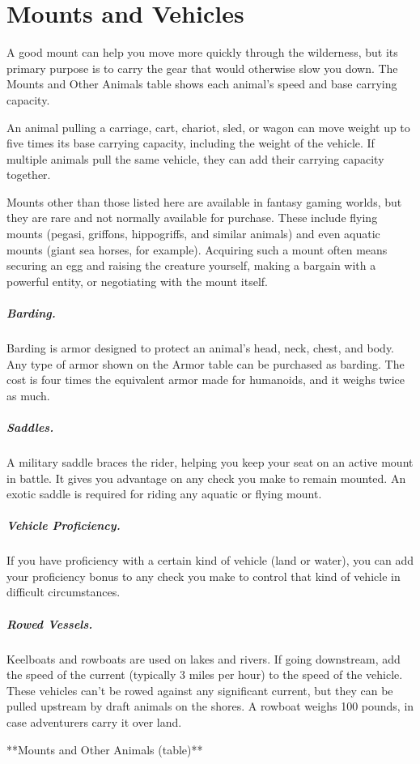 \section{Mounts and Vehicles}

A good mount can help you move more quickly through the wilderness, but its primary purpose is to carry the gear that would otherwise slow you down. The Mounts and Other Animals table shows each animal's speed and base carrying capacity.

An animal pulling a carriage, cart, chariot, sled, or wagon can move weight up to five times its base carrying capacity, including the weight of the vehicle. If multiple animals pull the same vehicle, they can add their carrying capacity together.

Mounts other than those listed here are available in fantasy gaming worlds, but they are rare and not normally available for purchase. These include flying mounts (pegasi, griffons, hippogriffs, and similar animals) and even aquatic mounts (giant sea horses, for example). Acquiring such a mount often means securing an egg and raising the creature yourself, making a bargain with a powerful entity, or negotiating with the mount itself.

\subparagraph*{Barding.} Barding is armor designed to protect an animal's head, neck, chest, and body. Any type of armor shown on the Armor table can be purchased as barding. The cost is four times the equivalent armor made for humanoids, and it weighs twice as much.

\subparagraph*{Saddles.} A military saddle braces the rider, helping you keep your seat on an active mount in battle. It gives you advantage on any check you make to remain mounted. An exotic saddle is required for riding any aquatic or flying mount.

\subparagraph*{Vehicle Proficiency.} If you have proficiency with a certain kind of vehicle (land or water), you can add your proficiency bonus to any check you make to control that kind of vehicle in difficult circumstances.

\subparagraph*{Rowed Vessels.} Keelboats and rowboats are used on lakes and rivers. If going downstream, add the speed of the current (typically 3 miles per hour) to the speed of the vehicle. These vehicles can't be rowed against any significant current, but they can be pulled upstream by draft animals on the shores. A rowboat weighs 100 pounds, in case adventurers carry it over land.

**Mounts and Other Animals (table)**


